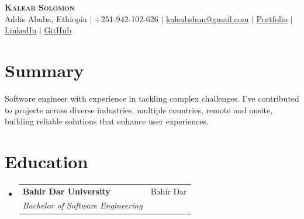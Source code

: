 \documentclass[letterpaper,11pt]{article}
\makeatletter
\newcommand{\resumeSubheading}[4]{
  \vspace{-2pt}\item
    \begin{tabular*}{0.97\textwidth}[t]{l@{\extracolsep{\fill}}r}
      \textbf{#1} & #2 \\
      \textit{\small#3} & \textit{\small #4} \\
    \end{tabular*}\vspace{-7pt}
}
\newcommand{\resumeSubHeadingListStart}{\begin{itemize}[leftmargin=0.15in, label={}]}
\newcommand{\resumeSubHeadingListEnd}{\end{itemize}}
\makeatother
\begin{document}
\begin{center}
    \textbf{\Huge \scshape Kaleab Solomon} \\ \vspace{1pt}
    \small Addis Ababa, Ethiopia $|$ +251-942-102-626 $|$ \href{mailto:kaleabslmn@gmail.com}{\underline{kaleabslmn@gmail.com}} $|$
    \href{https://kaleab.site}{\underline{Portfolio}} $|$
    \href{https://www.linkedin.com/in/kaleab-solomon-abebe/}{\underline{LinkedIn}} $|$
    \href{https://github.com/kaleabSolomon}{\underline{GitHub}}
\end{center}


\section{Summary}
  \small{Software engineer with experience in tackling complex challenges. I've contributed to projects across diverse industries, multiple countries, remote and onsite, building reliable solutions that enhance user experiences.}


\section{Education}
  \resumeSubHeadingListStart
    \resumeSubheading
      {Bahir Dar University}{Bahir Dar}
      {Bachelor of Software Engineering}{}
  \resumeSubHeadingListEnd


\end{document}
